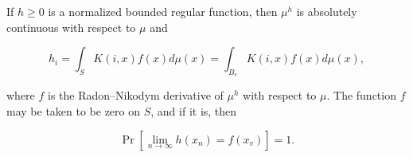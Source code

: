 If $h \geq 0$ is a normalized bounded regular function, then $\mu^h$ is absolutely continuous with respect to $\mu$ and

$$h_i = \int_S K(i, x)f(x)d\mu(x) = \int_{B_e} K(i, x)f(x)d\mu(x),$$

where $f$ is the Radon–Nikodym derivative of $\mu^h$ with respect to $\mu$. The function $f$ may be taken to be zero on $S$, and if it is, then

$$\Pr[\lim_{n \to \infty} h(x_n) = f(x_v)] = 1.$$
